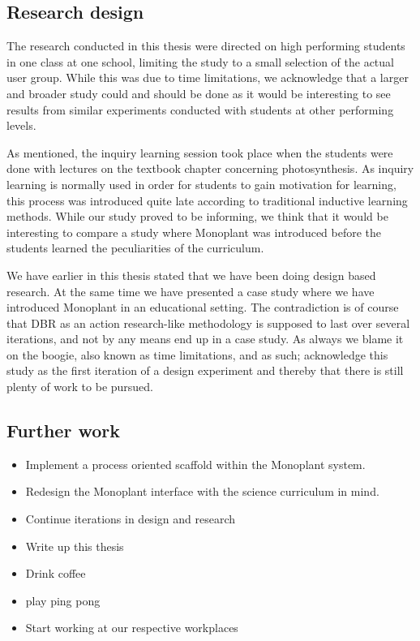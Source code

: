 \subsection{Research design}
The research conducted in this thesis were directed on high performing students in one class at one school, limiting the study to a small selection of the actual user group. While this was due to time limitations, we acknowledge that a larger and broader study could and should be done as it would be interesting to see results from similar experiments conducted with students at other performing levels.

As mentioned, the inquiry learning session took place when the students were done with lectures on the textbook chapter concerning photosynthesis. As inquiry learning is normally used in order for students to gain motivation for learning, this process was introduced quite late according to traditional inductive learning methods. While our study proved to be informing, we think that it would be interesting to compare a study where Monoplant was introduced before the students learned the peculiarities of the curriculum.

We have earlier in this thesis stated that we have been doing design based research. At the same time we have presented a case study where we have introduced Monoplant in an educational setting. The contradiction is of course that DBR as an action research-like methodology is supposed to last over several iterations, and not by any means end up in a case study. As always we blame it on the boogie, also known as time limitations, and as such; acknowledge this study as the first iteration of a design experiment and thereby that there is still plenty of work to be pursued.

\subsection{Further work}

\begin{itemize}
\item{Implement a process oriented scaffold within the Monoplant system.}
\item{Redesign the Monoplant interface with the science curriculum in mind.}
\item{Continue iterations in design and research}
\item{Write up this thesis}
\item{Drink coffee}
\item{play ping pong}
\item{Start working at our respective workplaces}
\end{itemize}